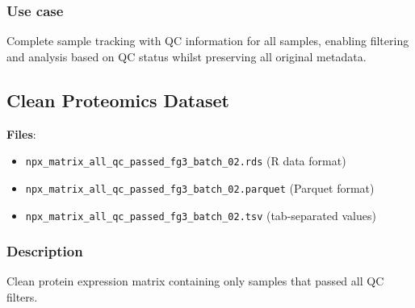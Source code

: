 \documentclass[11pt,a4paper]{article}
\begin{document}
\subsubsection{Use case}
Complete sample tracking with QC information for all samples, enabling filtering and analysis based on QC status whilst preserving all original metadata.

\subsection{Clean Proteomics Dataset}

\textbf{Files}:
\begin{itemize}
\item \texttt{npx\_matrix\_all\_qc\_passed\_fg3\_batch\_02.rds} (R data format)
\item \texttt{npx\_matrix\_all\_qc\_passed\_fg3\_batch\_02.parquet} (Parquet format)
\item \texttt{npx\_matrix\_all\_qc\_passed\_fg3\_batch\_02.tsv} (tab-separated values)
\end{itemize}

\subsubsection{Description}
Clean protein expression matrix containing only samples that passed all QC filters.
\end{document}
